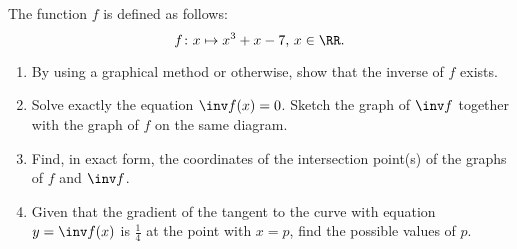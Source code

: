 \clearpage
\begin{problem}
    The function $f$ is defined as follows: \[f \colon x \mapsto x^3 + x - 7, \, x \in \RR.\]

    \begin{enumerate}
        \item By using a graphical method or otherwise, show that the inverse of $f$ exists.
        \item Solve exactly the equation $\inv f(x) = 0$. Sketch the graph of $\inv f$ together with the graph of $f$ on the same diagram.
        \item Find, in exact form, the coordinates of the intersection point(s) of the graphs of $f$ and $\inv f$.
        \item Given that the gradient of the tangent to the curve with equation $y = \inv f(x)$ is $\frac14$ at the point with $x = p$, find the possible values of $p$.
    \end{enumerate}
\end{problem}
